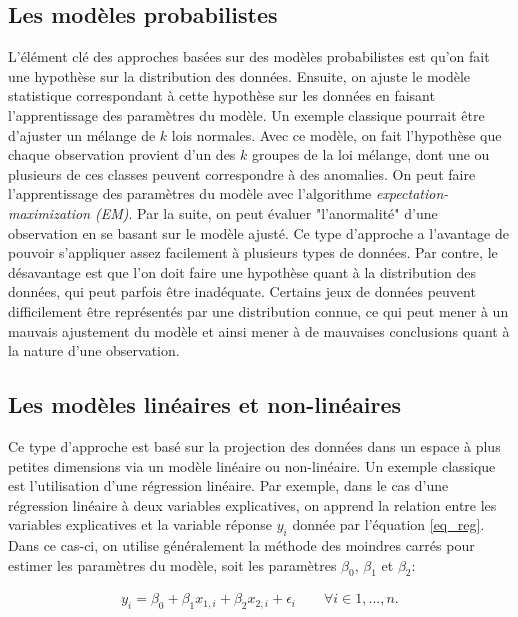 \subsection{Les modèles probabilistes}

L'élément clé des approches basées sur des modèles probabilistes  est qu'on fait une hypothèse sur la distribution des données. Ensuite, on ajuste le modèle statistique correspondant à cette hypothèse sur les données en faisant l'apprentissage des paramètres du modèle. Un exemple classique pourrait être d'ajuster un mélange de $k$ lois normales. Avec ce modèle, on fait l'hypothèse que chaque observation provient d'un des $k$ groupes de la loi mélange, dont une ou plusieurs de ces classes peuvent correspondre à des anomalies. On peut faire l'apprentissage des paramètres du modèle avec l'algorithme \textit{expectation-maximization (EM)}. Par la suite, on peut évaluer "l'anormalité" d'une observation en se basant sur le modèle ajusté. Ce type d'approche a l'avantage de pouvoir s'appliquer assez facilement à plusieurs types de données. Par contre, le désavantage est que l'on doit faire une hypothèse quant à la distribution des données, qui peut parfois être inadéquate. Certains jeux de données peuvent difficilement être représentés par une distribution connue, ce qui peut mener à un mauvais ajustement du modèle et ainsi mener à de mauvaises conclusions quant à la nature d'une observation.

\subsection{Les modèles linéaires et non-linéaires} \label{soussec:linear}

Ce type d'approche est basé sur la projection des données dans un espace à plus petites dimensions via un modèle linéaire ou non-linéaire. Un exemple classique est l'utilisation d'une régression linéaire. Par exemple, dans le cas d'une régression linéaire à deux variables explicatives, on apprend la relation entre les variables explicatives et la variable réponse $y_i$ donnée par l'équation \ref{eq_reg}. Dans ce cas-ci, on utilise généralement la méthode des moindres carrés pour estimer les paramètres du modèle, soit les paramètres $\beta_0$, $\beta_1$ et $\beta_2$:

\begin{gather}  \label{eq_reg}
y_i = \beta_0 + \beta_{1} x_{1,i} + \beta_2 x_{2,i} + \epsilon_{i} \qquad \forall i \in {1, ..., n}.
\end{gather}

